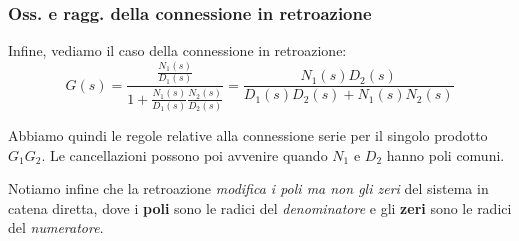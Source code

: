 \documentclass[a4paper,11pt]{article}
\begin{document}
\subsubsection{Oss. e ragg. della connessione in retroazione}
Infine, vediamo il caso della connessione in retroazione:
$$
G(s) = \frac{\frac{N_1(s)}{D_1(s)}}{1 + \frac{N_1(s)}{D_1(s)} \frac{N_2(s)}{D_2(s)}} = \frac{N_1(s)D_2(s)}{D_1(s)D_2(s) + N_1(s)N_2(s)}
$$

Abbiamo quindi le regole relative alla connessione serie per il singolo prodotto $G_1 G_2$.
Le cancellazioni possono poi avvenire quando $N_1$ e $D_2$ hanno poli comuni.

Notiamo infine che la retroazione \textit{modifica i poli ma non gli zeri} del sistema in catena diretta, dove i \textbf{poli} sono le radici del \textit{denominatore} e gli \textbf{zeri} sono le radici del \textit{numeratore}.
\end{document}
